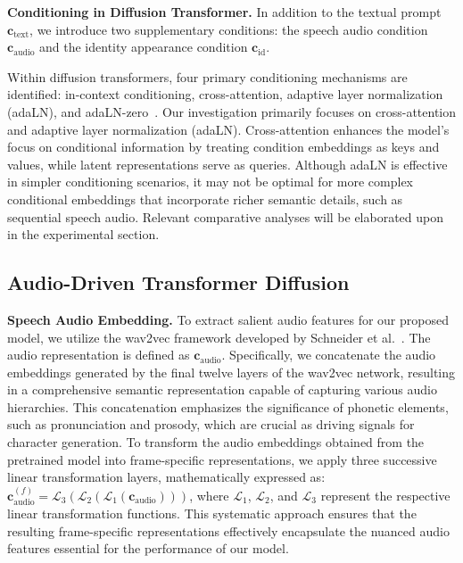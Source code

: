 \noindent\textbf{Conditioning in Diffusion Transformer.}  
In addition to the textual prompt \(\mathbf{c}_{\text{text}}\), we introduce two supplementary conditions: the speech audio condition \(\mathbf{c}_{\text{audio}}\) and the identity appearance condition \(\mathbf{c}_{\text{id}}\).  

Within diffusion transformers, four primary conditioning mechanisms are identified: in-context conditioning, cross-attention, adaptive layer normalization (adaLN), and adaLN-zero~\cite{Peebles2022DiT}. 
Our investigation primarily focuses on cross-attention and adaptive layer normalization (adaLN). Cross-attention enhances the model's focus on conditional information by treating condition embeddings as keys and values, while latent representations serve as queries. 
Although adaLN is effective in simpler conditioning scenarios, it may not be optimal for more complex conditional embeddings that incorporate richer semantic details, such as sequential speech audio. Relevant comparative analyses will be elaborated upon in the experimental section.  

\subsection{Audio-Driven Transformer Diffusion}\label{sec:audio}
\noindent\textbf{Speech Audio Embedding.}  
To extract salient audio features for our proposed model, we utilize the wav2vec framework developed by Schneider et al.~\cite{schneider2019wav2vec}. The audio representation is defined as \(\mathbf{c}_{\text{audio}}\). 
Specifically, we concatenate the audio embeddings generated by the final twelve layers of the wav2vec network, resulting in a comprehensive semantic representation capable of capturing various audio hierarchies. 
This concatenation emphasizes the significance of phonetic elements, such as pronunciation and prosody, which are crucial as driving signals for character generation. 
To transform the audio embeddings obtained from the pretrained model into frame-specific representations, we apply three successive linear transformation layers, mathematically expressed as: $\mathbf{c}_{\text{audio}}^{(f)} = \mathcal{L}_3 \left( \mathcal{L}_2 \left( \mathcal{L}_1 \left( \mathbf{c}_{\text{audio}} \right) \right) \right)$, where \(\mathcal{L}_1\), \(\mathcal{L}_2\), and \(\mathcal{L}_3\) represent the respective linear transformation functions. This systematic approach ensures that the resulting frame-specific representations effectively encapsulate the nuanced audio features essential for the performance of our model.  

